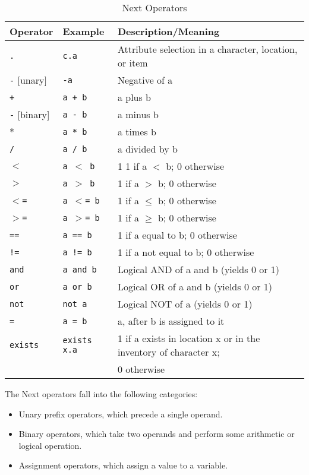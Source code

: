 \documentclass[12pt]{article}
\begin{document}
\begin{table}[htdp]
\caption{Next Operators}
\begin{center}
\begin{tabular}{|l|l|l|}
\hline
\textbf{Operator} & \textbf{Example} & \textbf{Description/Meaning} \\
\hline
\texttt{.}&\texttt{c.a}&Attribute selection in a character, location, or item \\
\hline
\texttt{-} [unary]&\texttt{-a}&Negative of a \\
\hline
\texttt{+} & \texttt{a + b} & a plus b \\
\texttt{-} [binary]& \texttt{a - b} & a minus b\\
\texttt{$*$} & \texttt{a * b} & a times b \\
\texttt{/} & \texttt{a / b} & a divided by b \\
\hline
\texttt{$<$} & \texttt{a $<$ b} & 1 1 if a $<$ b; 0 otherwise \\
\texttt{$>$} & \texttt{a $>$ b} & 1 if a $>$ b; 0 otherwise \\
\texttt{$<$=} & \texttt{a $<$= b}& 1 if a $\leq$ b; 0 otherwise\\
\texttt{$>$=}& \texttt{a $>$= b} & 1 if a $\geq$ b; 0 otherwise \\
\texttt{==} & \texttt{a == b}& 1 if a equal to b; 0 otherwise \\
\texttt{!=} & \texttt{a != b} & 1 if a not equal to b; 0 otherwise \\
\hline
\texttt{and} & \texttt{a and b} & Logical AND of a and b (yields 0 or 1) \\
\texttt{or} & \texttt{a or b} & Logical OR of a and b (yields 0 or 1) \\
\texttt{not} & \texttt{not a} & Logical NOT of a (yields 0 or 1) \\
\hline
\texttt{=} & \texttt{a = b} & a, after b is assigned to it \\
\hline
\texttt{exists} & \texttt{exists x.a} & 1 if a exists in location x or in the inventory of character x; \\ & & 0 otherwise \\
\hline
\end{tabular}
\end{center}
\label{operators}
\end{table}%

\noindent The Next operators fall into the following categories:
\begin{itemize}
\item Unary prefix operators, which precede a single operand.
\item Binary operators, which take two operands and perform some arithmetic or logical operation.
\item Assignment operators, which assign a value to a variable.
\end{itemize}
\end{document}
